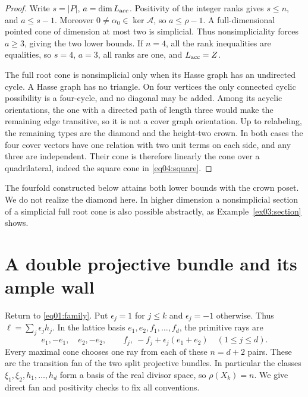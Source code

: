 \documentclass[11pt]{amsart}
\theoremstyle{definition}
\theoremstyle{remark}
\begin{document}
\begin{proof}
Write \(s=|P|\), \(a=\dim L_{\rm acc}\). Positivity of the
integer ranks gives \(s\le n\), and \(a\le s-1\). Moreover
\(0\ne\alpha_0\in\ker\mathcal A\), so \(a\le\rho-1\).
A full-dimensional pointed cone of dimension at most two is
simplicial. Thus nonsimpliciality forces \(a\ge3\), giving the
two lower bounds. If \(n=4\), all the rank inequalities are equalities,
so \(s=4\), \(a=3\), all ranks are one, and \(L_{\rm acc}=Z\).

The full root cone is nonsimplicial only when its Hasse graph has
an undirected cycle. A Hasse graph has no triangle. On four vertices
the only connected cyclic possibility is a four-cycle, and no
diagonal may be added. Among its acyclic orientations, the one with
a directed path of length three would make the remaining edge
transitive, so it is not a cover graph orientation. Up to relabeling,
the remaining types are the diamond and the height-two crown.
In both cases the four cover vectors have one relation with two
unit terms on each side, and any three are independent. Their cone
is therefore linearly the cone over a quadrilateral, indeed the
square cone in \eqref{eq04:square}.
\end{proof}

The fourfold constructed below attains both lower bounds with the crown
poset. We do not realize the diamond here. In higher dimension a
nonsimplicial section of a simplicial full root cone is also possible
abstractly, as Example~\ref{ex03:section} shows.

\section{A double projective bundle and its ample wall}\label{sec05:family}

Return to \eqref{eq01:family}. Put \(\epsilon_j=1\) for \(j\le k\)
and \(\epsilon_j=-1\) otherwise. Thus
\(\ell=\sum_j\epsilon_jh_j\). In the lattice basis
\(e_1,e_2,f_1,\ldots,f_d\), the primitive rays are
\begin{equation}\label{eq05:rays}
 e_1,-e_1,\quad e_2,-e_2,\qquad
 f_j,\ -f_j+\epsilon_j(e_1+e_2)\quad(1\le j\le d).
\end{equation}
Every maximal cone chooses one ray from each of these \(n=d+2\)
pairs. These are the transition fan of the two split projective
bundles. In particular the classes \(\xi_1,\xi_2,h_1,\ldots,h_d\)
form a basis of the real divisor space, so \(\rho(X_k)=n\).
We give direct fan and positivity checks to fix all conventions.
\end{document}
